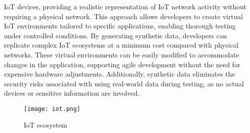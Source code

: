 IoT devices, providing a realistic representation of IoT network activity without requiring a physical network. This approach allows developers to create virtual IoT environments tailored to specific applications, enabling thorough testing under controlled conditions. By generating synthetic data, developers can replicate complex IoT ecosystems at a minimum cost compared with physical networks. These virtual environments can be easily modified to accommodate changes in the application, supporting agile development without the need for expensive hardware adjustments. Additionally, synthetic data eliminates the security risks associated with using real-world data during testing, as no actual devices or sensitive information are involved.

\begin{figure}[!h]
    \graphicspath{ {./diagrams/} }
    \texttt{[image: iot.png]}
    \centering
    \caption{IoT ecosystem}
    \label{fig:iot_eco}
\end{figure}